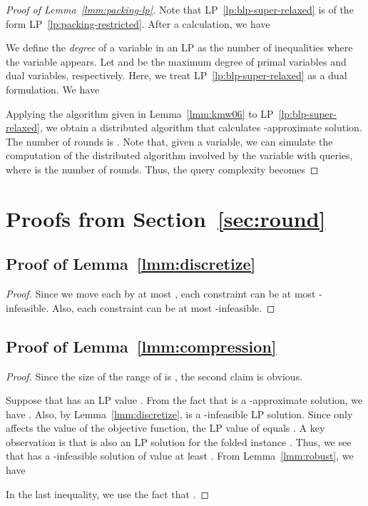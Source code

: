 \documentclass[letterpaper, 11pt]{article}
\begin{document}
\begin{proof}[Proof of Lemma~\ref{lmm:packing-lp}]
  Note that LP~\eqref{lp:blp-super-relaxed} is of the form LP~\eqref{lp:packing-restricted}.
  After a calculation, we have
  
  We define the \textit{degree} of a variable in an LP as the number of inequalities where the variable appears.
  Let  and  be the maximum degree of primal variables and dual variables, respectively.
  Here, we treat LP~\eqref{lp:blp-super-relaxed} as a dual formulation.
  We have
  

  Applying the algorithm given in Lemma~\ref{lmm:kmw06} to LP~\eqref{lp:blp-super-relaxed},
  we obtain a distributed algorithm that calculates -approximate solution.
  The number of rounds is .
  Note that,
  given a variable,
  we can simulate the computation of the distributed algorithm involved by the variable with  queries,
  where  is the number of rounds.
  Thus, the query complexity becomes
  
\end{proof}

\section{Proofs from Section~\ref{sec:round}}\label{apx:round-appendix}
\subsection{Proof of Lemma~\ref{lmm:discretize}}
\begin{proof}
  Since we move each  by at most ,
  each constraint  can be at most -infeasible.
  Also, each constraint  can be at most -infeasible.
\end{proof}

\subsection{Proof of Lemma~\ref{lmm:compression}}
\begin{proof}
  Since the size of the range of  is , the second claim is obvious.

  Suppose that  has an LP value .
  From the fact that  is a -approximate solution, 
  we have .
  Also, by Lemma~\ref{lmm:discretize}, 
   is a -infeasible LP solution.
  Since only  affects the value of the objective function, 
  the LP value of  equals .
  A key observation is that  is also an LP solution for the folded instance .
  Thus, we see that  has a -infeasible solution of value at least .
  From Lemma~\ref{lmm:robust}, we have
  
  In the last inequality,
  we use the fact that .
\end{proof}
\end{document}
